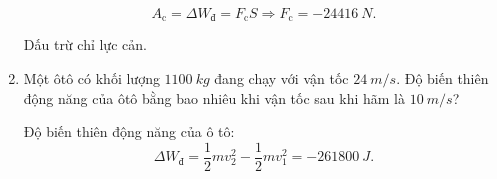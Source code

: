 \begin{enumerate}[label=\bfseries Câu \arabic*:]
{		$$A_\text{c} = \Delta W_\text{đ} = F_\text{c}S \Rightarrow F_\text{c} = -\SI{24416}{N}.$$
		
		Dấu trừ chỉ lực cản.
	}
	\item {}
	
	
	{
		Một ôtô có khối lượng $\SI{1100}{kg}$ đang chạy với vận tốc $\SI{24}{m/s}$. Độ biến thiên động năng của ôtô bằng bao nhiêu khi vận tốc sau khi hãm là $\SI{10}{m/s}$?
		
		
	}
	
	\hideall
	{	
		Độ biến thiên động năng của ô tô:
		$$\Delta W_\text{đ} = \dfrac{1}{2}mv_2^2 - \dfrac{1}{2}mv_1^2 = - \SI{261800}{J}.$$
	}

\end{enumerate}